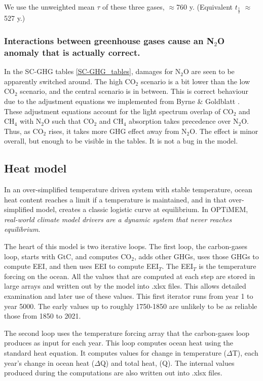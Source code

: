 \documentclass{article}
\begin{document}
We use the unweighted mean $\tau$ of these three gases, $\approx$760 y. (Equivalent $t_{\frac{1}{2}}$ $\approx$ 527 y.) 

\subsubsection{Interactions between greenhouse gases cause an N$_2$O anomaly that is actually correct.}
\label{SC-GHG_N2O_anomaly}
In the SC-GHG tables \ref{SC-GHG_tables}, damages for N$_2$O are seen to be apparently switched around. The high CO$_2$ scenario is a bit lower than the low CO$_2$ scenario, and the central scenario is in between. This is correct behaviour due to the adjustment equations we implemented from Byrne \& Goldblatt \cite[pp. 19, 157, Table 2]{Byrne2014RadiativeForcingEquations}. These adjustment equations account for the light spectrum overlap of CO$_2$ and CH$_4$ with N$_2$O such that CO$_2$ and CH$_4$ absorption takes precedence over N$_2$O. Thus, as CO$_2$ rises, it takes more GHG effect away from N$_2$O. The effect is minor overall, but enough to be visible in the tables. It is not a bug in the model.

\subsection{Heat model }
 In an over-simplified temperature driven system with stable temperature, ocean heat content reaches a limit if a temperature is maintained, and in that over-simplified model, creates a classic logistic curve at equilibrium.  In OPTiMEM, \emph{real-world climate model drivers are a dynamic system that never reaches equilibrium}. 

 The heart of this model is two iterative loops. The first loop, the carbon-gases loop, starts with GtC, and computes CO$_2$, adds other GHGs, uses those GHGs to compute EEI, and then uses EEI to compute EEI$_T$. The EEI$_T$ is the temperature forcing on the ocean. All the values that are computed at each step are stored in large arrays and written out by the model into .xlsx files. This allows detailed examination and later use of these values. This first iterator runs from year 1 to year 5000. The early values up to roughly 1750-1850 are unlikely to be as reliable those from 1850 to 2021. 
 
The second loop uses the temperature forcing array that the carbon-gases loop produces as input for each year. This loop computes ocean heat using the standard heat equation. It computes values for change in temperature ($\Delta$T), each year's change in ocean heat ($\Delta$Q) and total heat, (Q). The internal values produced during the computations are also written out into .xlsx files. 
\end{document}
